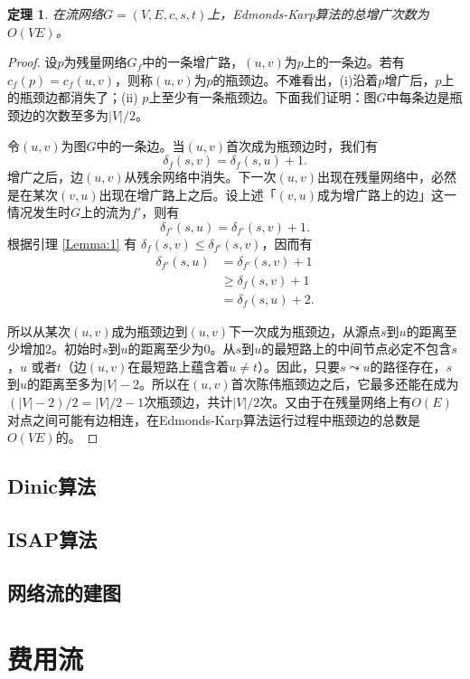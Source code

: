 \documentclass[fontset=ubuntu]{ctexbook}
\newtheorem{theorem}{定理}
\begin{document}
    \begin{theorem}
        在流网络$G=(V,E,c,s,t)$上，Edmonds-Karp算法的总增广次数为$O(VE)$。
    \end{theorem}
    \begin{proof}
        设$p$为残量网络$G_f$中的一条增广路，$(u,v)$为$p$上的一条边。若有$c_f(p) = c_f(u,v)$，则称$(u,v)$为$p$的瓶颈边。不难看出，(i)沿着$p$增广后，$p$上的瓶颈边都消失了；(ii) $p$上至少有一条瓶颈边。下面我们证明：图$G$中每条边是瓶颈边的次数至多为$|V|/2$。

        令$(u,v)$为图$G$中的一条边。当$(u,v)$首次成为瓶颈边时，我们有
        \[
        \delta_f(s,v) = \delta_f(s,u) + 1 .
        \]
        增广之后，边$(u,v)$从残余网络中消失。下一次$(u,v)$出现在残量网络中，必然是在某次$(v,u)$出现在增广路上之后。设上述「$(v,u)$成为增广路上的边」这一情况发生时$G$上的流为$f'$，则有
        \[
        \delta_{f'}(s,u) = \delta_{f'}(s,v) + 1.
        \]
        根据引理 \ref{Lemma:1} 有 $\delta_f(s,v)\le\delta_{f'}(s,v)$，因而有
        \begin{align*}
            \delta_{f'}(s,u) &= \delta_{f'}(s,v) + 1 \\
            &\ge \delta_f(s,v) + 1 \\
            &= \delta_f(s,u) + 2 .
        \end{align*}

        所以从某次$(u,v)$成为瓶颈边到$(u,v)$下一次成为瓶颈边，从源点$s$到$u$的距离至少增加$2$。初始时$s$到$u$的距离至少为$0$。从$s$到$u$的最短路上的中间节点必定不包含$s$，$u$ 或者$t$（边$(u,v)$在最短路上蕴含着$u\ne t$）。因此，只要$s\leadsto u$的路径存在，$s$到$u$的距离至多为$|V|-2$。所以在$(u,v)$首次陈伟瓶颈边之后，它最多还能在成为$(|V|-2)/2=|V|/2-1$次瓶颈边，共计$|V|/2$次。又由于在残量网络上有$O(E)$对点之间可能有边相连，在Edmonds-Karp算法运行过程中瓶颈边的总数是$O(VE)$的。
    \end{proof}
    \subsection{Dinic算法}
    \subsection{ISAP算法}
    \subsection{网络流的建图}
    \section{费用流}
\end{document}
